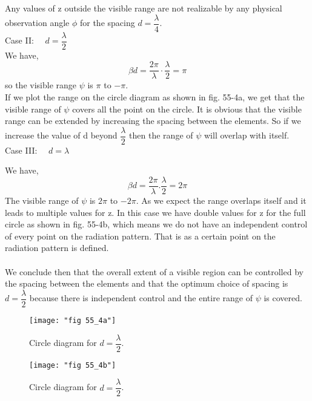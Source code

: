 	Any values of z outside the visible range are not realizable by any physical observation angle $\phi$ for the spacing $d=\dfrac{\lambda}{4}$.
	\\
	
	Case II: $\quad d=\dfrac{\lambda}{2}$
	\\
	
	We have, $$\beta d=\dfrac{2\pi}{\lambda}\cdot \frac{\lambda}{2} = \pi$$
	so the visible range $\psi$ is $\pi$ to $-\pi$.
	\\

	If we plot the range on the circle diagram as shown in fig. 55-4a, we get that the visible range of $\psi$ covers all the point on the circle. It is obvious that the visible range can be extended by increasing the spacing between the elements. So if we increase the value of d beyond $\dfrac{\lambda}{2}$ then the range of $\psi$ will overlap with itself.
	\\
	
	Case III: $\quad d=\lambda$
	
	We have, $$\beta d=\dfrac{2\pi}{\lambda}.\dfrac{\lambda}{2} = 2\pi$$
	The visible range of $\psi$ is $2\pi$ to $-2\pi$. As we expect the range overlaps itself and it leads to multiple values for z. In this case we have double values for z for the full circle as shown in fig. 55-4b, which means we do not have an independent control of every point on the radiation pattern. That is as a certain point on the radiation pattern is defined.
	\paragraph{}
	We conclude then that the overall extent of a visible region can be controlled by the spacing between the elements and that the optimum choice of spacing is $d=\dfrac{\lambda}{2}$ because there is independent control and the entire range of $\psi$ is covered.

	\begin{figure}[H]
		\centering
		\begin{minipage}[b]{0.4\textwidth}
			\texttt{[image: "fig 55\_4a"]}
			\caption{Circle diagram for $d=\dfrac{\lambda}{2}$.}
			\label{fig:fig-55_4a}
		\end{minipage}
		\hfill
		\begin{minipage}[b]{0.4\textwidth}
			\texttt{[image: "fig 55\_4b"]}
			\caption{Circle diagram for $d=\dfrac{\lambda}{2}$.}
			\label{fig:fig-55_4a}
		\end{minipage}
	\end{figure}

